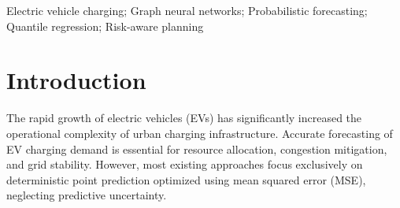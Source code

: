 \documentclass[conference]{IEEEtran}
\begin{document}
\maketitle
\begin{abstract}
    Accurate forecasting of electric vehicle (EV) charging demand is essential for grid stability and resource planning, yet most existing models provide only deterministic point estimates without uncertainty quantification. We develop a probabilistic forecasting framework that augments a spatio‑temporal backbone with a monotonic quantile prediction head and conformalized quantile regression (CQR). The monotonic head uses incremental softplus parameterization to ensure non‑negative, non‑crossing quantile forecasts, trained via pinball loss, while CQR provides distribution‑free finite‑sample coverage through calibration on a held‑out set. Experiments on the UrbanEV benchmark show improved median accuracy over deterministic baselines, and conformal calibration raises empirical coverage from 62.2\% to 88.5\% under a 90\% nominal target with minimal interval widening. Sensitivity analysis across risk levels demonstrates the robustness and configurability of the proposed framework for risk‑aware charging infrastructure management.
\end{abstract}
\begin{IEEEkeywords}
Electric vehicle charging; Graph neural networks; Probabilistic forecasting; Quantile regression; Risk-aware planning
\end{IEEEkeywords}


\section{Introduction}
The rapid growth of electric vehicles (EVs) has significantly increased the operational complexity of urban charging infrastructure. Accurate forecasting of EV charging demand is essential for resource allocation, congestion mitigation, and grid stability. However, most existing approaches focus exclusively on deterministic point prediction optimized using mean squared error (MSE), neglecting predictive uncertainty.
\end{document}
